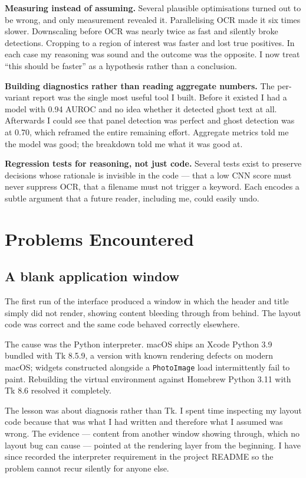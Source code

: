\documentclass[12pt,oneside]{report}
\newcommand{\code}[1]{\texttt{\small #1}}
\begin{document}
\textbf{Measuring instead of assuming.} Several plausible optimisations turned
out to be wrong, and only measurement revealed it. Parallelising OCR made it
six times slower. Downscaling before OCR was nearly twice as fast and silently
broke detections. Cropping to a region of interest was faster and lost true
positives. In each case my reasoning was sound and the outcome was the
opposite. I now treat ``this should be faster'' as a hypothesis rather than a
conclusion.

\textbf{Building diagnostics rather than reading aggregate numbers.} The
per-variant report was the single most useful tool I built. Before it existed I
had a model with 0.94 AUROC and no idea whether it detected ghost text at all.
Afterwards I could see that panel detection was perfect and ghost detection was
at 0.70, which reframed the entire remaining effort. Aggregate metrics told me
the model was good; the breakdown told me what it was good at.

\textbf{Regression tests for reasoning, not just code.} Several tests exist to
preserve decisions whose rationale is invisible in the code --- that a low CNN
score must never suppress OCR, that a filename must not trigger a keyword. Each
encodes a subtle argument that a future reader, including me, could easily
undo.

\section{Problems Encountered}
\label{sec:problems}

\subsection{A blank application window}
\label{sec:tkbug}

The first run of the interface produced a window in which the header and title
simply did not render, showing content bleeding through from behind. The layout
code was correct and the same code behaved correctly elsewhere.

The cause was the Python interpreter. macOS ships an Xcode Python 3.9 bundled
with Tk 8.5.9, a version with known rendering defects on modern macOS; widgets
constructed alongside a \code{PhotoImage} load intermittently fail to paint.
Rebuilding the virtual environment against Homebrew Python 3.11 with Tk 8.6
resolved it completely.

The lesson was about diagnosis rather than Tk. I spent time inspecting my
layout code because that was what I had written and therefore what I assumed
was wrong. The evidence --- content from another window showing through, which
no layout bug can cause --- pointed at the rendering layer from the beginning.
I have since recorded the interpreter requirement in the project README so the
problem cannot recur silently for anyone else.
\end{document}
